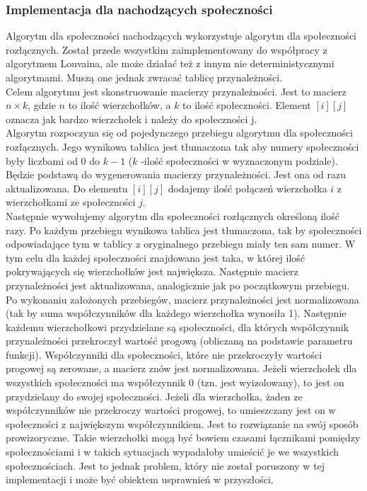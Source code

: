 \documentclass{article}
\begin{document}
\subsubsection{Implementacja dla nachodzących społeczności}
Algorytm dla społeczności nachodzących wykorzystuje algorytm dla społeczności rozłącznych. Został przede wszystkim zaimplementowany do współpracy z algorytmem Louvaina, ale może działać też z innym nie deterministycznymi algorytmami. Muszą one jednak zwracać tablicę przynależności. \\
Celem algorytmu jest skonstruowanie macierzy przynależności. Jest to macierz $n \times k$, gdzie $n$ to ilość wierzchołków, a $k$ to ilość społeczności. Element $[i][j]$ oznacza jak bardzo wierzchołek i należy do społeczności j.
\\ Algorytm rozpoczyna się od pojedynczego przebiegu algorytmu dla społeczności rozłącznych. Jego wynikowa tablica jest tłumaczona tak aby numery społeczności były liczbami od $0$ do $k-1$ ($k$ -ilość społeczności w wyznaczonym podziale). Będzie podstawą do wygenerowania macierzy przynależności. Jest ona od razu aktualizowana. Do elementu $[i][j]$ dodajemy ilość połączeń wierzchołka $i$ z wierzchołkami ze społeczności $j$.\\
Następnie wywołujemy algorytm dla społeczności rozłącznych określoną ilość razy. Po każdym przebiegu wynikowa tablica jest tłumaczona, tak by społeczności odpowiadające tym w tablicy z oryginalnego przebiegu miały ten sam numer. W tym celu dla każdej społeczności znajdowana jest taka, w której ilość pokrywających się wierzchołków jest największa. Następnie macierz przynależności jest aktualizowana, analogicznie jak po początkowym przebiegu.
\\ Po wykonaniu założonych przebiegów, macierz przynależności jest normalizowana (tak by suma współczynników dla każdego wierzchołka wynosiła 1). Następnie każdemu wierzchołkowi przydzielane są społeczności, dla których współczynnik przynależności przekroczył wartość progową (obliczaną na podstawie parametru funkcji). Współczynniki dla społeczności, które nie przekroczyły wartości progowej są zerowane, a macierz znów jest normalizowana. Jeżeli wierzchołek dla wszystkich społeczności ma współczynnik 0 (tzn. jest wyizolowany), to jest on przydzielany do swojej społeczności. Jeżeli dla wierzchołka, żaden ze współczynników nie przekroczy wartości progowej, to umieszczany jest on w społeczności z największym współczynnikiem. Jest to rozwiązanie na swój sposób prowizoryczne. Takie wierzchołki mogą być bowiem czasami łącznikami pomiędzy społecznościami i w takich sytuacjach wypadałoby umieścić je we wszystkich społecznościach. Jest to jednak problem, który nie został poruszony w tej implementacji i może być obiektem usprawnień w przyszłości.
\end{document}
